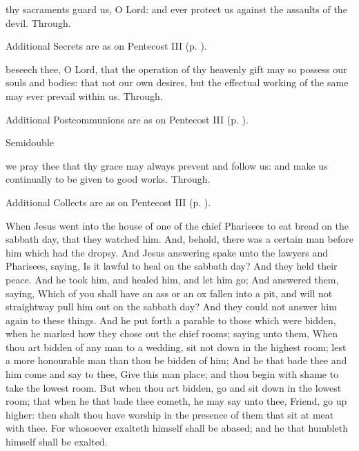 \secret
{} thy sacraments guard us, O Lord: and ever protect us against the assaults of the devil. Through.
\begin{rubric}
    Additional Secrets are as on Pentecost III (p. \pageref{PentecostIII}).
\end{rubric}

\postcommunion
{} beseech thee, O Lord, that the operation of thy heavenly gift may so possess our souls and bodies: that not our own desires, but the effectual working of the same may ever prevail within us. Through.
\begin{rubric}
    Additional Postcommunions are as on Pentecost III (p. \pageref{PentecostIII}).
\end{rubric}

\begin{inhead}
{Semidouble}
\end{inhead}

\collect
{} we pray thee that thy grace may always prevent and follow us: and make us continually to be given to good works. Through.
\begin{rubric}
    Additional Collects are as on Pentecost III (p. \pageref{PentecostIII}).
\end{rubric}

 When Jesus went into the house of one of the chief Pharisees to eat bread on the sabbath day, that they watched him. And, behold, there was a certain man before him which had the dropsy. And Jesus answering spake unto the lawyers and Pharisees, saying, Is it lawful to heal on the sabbath day? And they held their peace. And he took him, and healed him, and let him go; And answered them, saying, Which of you shall have an ass or an ox fallen into a pit, and will not straightway pull him out on the sabbath day? And they could not answer him again to these things. And he put forth a parable to those which were bidden, when he marked how they chose out the chief rooms; saying unto them, When thou art bidden of any man to a wedding, sit not down in the highest room; lest a more honourable man than thou be bidden of him; And he that bade thee and him come and say to thee, Give this man place; and thou begin with shame to take the lowest room. But when thou art bidden, go and sit down in the lowest room; that when he that bade thee cometh, he may say unto thee, Friend, go up higher: then shalt thou have worship in the presence of them that sit at meat with thee. For whosoever exalteth himself shall be abased; and he that humbleth himself shall be exalted.

